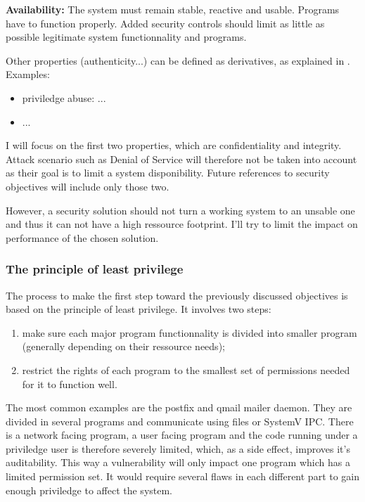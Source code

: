 \documentclass[pdftex,a4paper,titlepage,11pt]{article}
\begin{document}
\medskip

\textbf{Availability:}
The system must remain stable, reactive and usable. Programs have to function
properly. Added security controls should limit as little as possible legitimate
system functionnality and programs.

\bigskip

Other properties (authenticity...) can be defined as derivatives, as explained
in \cite{THESEBRIFFAUT}. Examples:
\begin{itemize}
	\item priviledge abuse: ...
	\item ... %
\end{itemize}

\smallskip

I will focus on the first two properties, which are confidentiality and
integrity. Attack scenario such as Denial of Service will therefore not be taken
into account as their goal is to limit a system disponibility. Future references
to security objectives will include only those two.

\bigskip

However, a security solution should not turn a working system to an unsable one
and thus it can not have a high ressource footprint. I'll try to limit the
impact on performance of the chosen solution.

\subsubsection{The principle of least privilege}

The process to make the first step toward the previously discussed objectives is
based on the principle of least privilege. It involves two steps:
\begin{enumerate}
	\item make sure each major program functionnality is divided into smaller
program (generally depending on their ressource needs);
	\item restrict the rights of each program to the smallest set of permissions
needed for it to function well.
\end{enumerate}

\smallskip

The most common examples are the postfix and qmail mailer daemon. They are
divided in several programs and communicate using files or SystemV IPC. There is
a network facing program, a user facing program and the code running under a
priviledge user is therefore severely limited, which, as a side effect, improves
it's auditability. This way a vulnerability will only impact one program which
has a limited permission set. It would require several flaws in each different
part to gain enough priviledge to affect the system.
\end{document}
